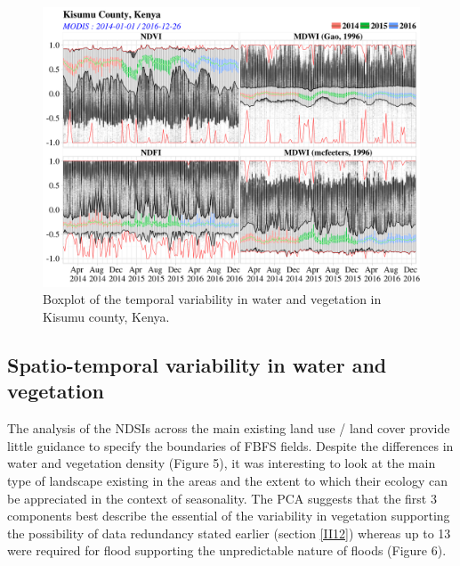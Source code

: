 \documentclass[12pt,oneside]{article}
\begin{document}
\begin{figure}
\includegraphics[width=1\linewidth]{figures/Mapping_FBFS_boxplot_temporal_variability} \caption{Boxplot of the temporal variability in water and vegetation in Kisumu county, Kenya.}\label{fig:fig5}
\end{figure}

\hypertarget{II3}{%
\subsection{Spatio-temporal variability in water and vegetation}\label{II3}}

The analysis of the NDSIs across the main existing land use / land cover provide little guidance to specify the boundaries of FBFS fields. Despite the differences in water and vegetation density (Figure 5), it was interesting to look at the main type of landscape existing in the areas and the extent to which their ecology can be appreciated in the context of seasonality. The PCA suggests that the first 3 components best describe the essential of the variability in vegetation supporting the possibility of data redundancy stated earlier (section \ref{II12}) whereas up to 13 were required for flood supporting the unpredictable nature of floods (Figure 6).
\end{document}

